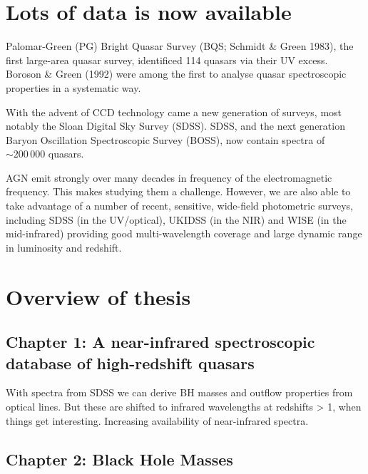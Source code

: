 \section{Lots of data is now available}

Palomar-Green (PG) Bright Quasar Survey (BQS; Schmidt \& Green 1983), the first large-area quasar survey, identificed 114 quasars via their UV excess. 
Boroson \& Green (1992) were among the first to analyse quasar spectroscopic properties in a systematic way.

With the advent of CCD technology came a new generation of surveys, most notably the Sloan Digital Sky Survey (SDSS). 
SDSS, and the next generation Baryon Oscillation Spectroscopic Survey (BOSS), now contain spectra of $\sim200\,000$ quasars. 

AGN emit strongly over many decades in frequency of the electromagnetic frequency. 
This makes studying them a challenge. 
However, we are also able to take advantage of a number of recent, sensitive, wide-field photometric surveys, including SDSS (in the UV/optical), UKIDSS (in the NIR) and WISE (in the mid-infrared) providing good multi-wavelength coverage and large dynamic range in luminosity and redshift.  

\section{Overview of thesis}

\subsection{Chapter 1: A near-infrared spectroscopic database of high-redshift quasars}

With spectra from SDSS we can derive BH masses and outflow properties from optical lines. 
But these are shifted to infrared wavelengths at redshifts > 1, when things get interesting. 
Increasing availability of near-infrared spectra. 

\subsection{Chapter 2: Black Hole Masses}

